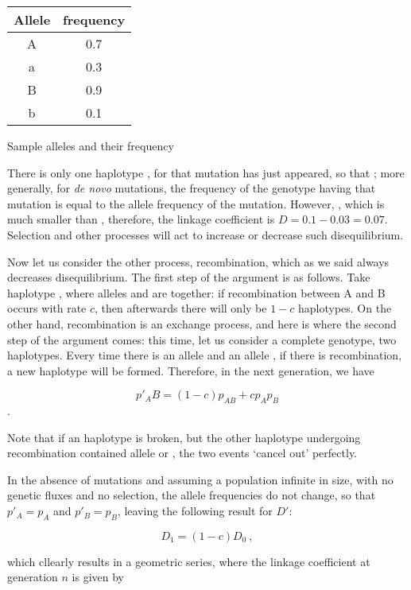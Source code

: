 \documentclass[../main.tex]{subfiles}
\begin{document}
\begin{margintable}
\begin{tabular}{|c|c|}
	\hline
	Allele	& frequency	\\
	\hline
	A		& 0.7		\\
	a		& 0.3		\\
	B		& 0.9		\\
	b		& 0.1		\\
	\hline
\end{tabular}
\caption{Sample alleles and their frequency}
\end{margintable}

There is only one haplotype , for that mutation has just 
appeared, so that ; more generally, for \textit{de 
	novo} mutations, the frequency of the genotype having that mutation 
is equal to the allele frequency of the mutation. However, , which is much smaller than , 
therefore, the linkage coefficient is \(D = 0.1 - 0.03 = 0.07\). 
Selection and other processes will act to increase or decrease such 
disequilibrium.

Now let us consider the other process, recombination, which as we said 
always decreases disequilibrium. The first step of the argument is as 
follows. Take haplotype , where alleles  and  
are together: if recombination between A and B occurs with rate \(c\), 
then afterwards there will only be \(1-c\)  haplotypes. On the 
other hand, recombination is an exchange process, and here is where the 
second step of the argument comes: this time, let us consider a complete 
genotype, \ie two haplotypes. Every time there is an allele  and 
an allele , if there is recombination, a new  haplotype 
will be formed. Therefore, in the next generation, we have

\[p'_AB = (1 - c) p_{AB} + c p_A p_B\].

Note that if an  haplotype is broken, but the other haplotype 
undergoing recombination contained allele  or , the two 
events `cancel out' perfectly.

In the absence of mutations and assuming a population infinite in size, 
with no genetic fluxes and no selection, the allele frequencies do not 
change, so that \(p'_A = p_A\) and \(p'_B = p_B\), leaving the following 
result for \(D'\):

\[D_1 = (1 - c) D_0\ ,\]

which cllearly results in a geometric series, where the linkage 
coefficient at generation \(n\) is given by
\end{document}

